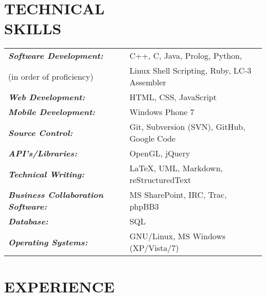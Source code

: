 \documentclass[margin]{res}
\begin{document}
\begin{resume}

\section{TECHNICAL \\ SKILLS}
	\begin{tabular}{l l}
	{\sl \textbf{Software Development:}} &
  C++, C, Java, Prolog, Python, \\ (in order of proficiency) &
  Linux Shell Scripting, Ruby, LC-3 Assembler \\

	{\sl \textbf{Web Development:}} &
	HTML, CSS, JavaScript \\

	{\sl \textbf{Mobile Development:}} &
	Windows Phone 7 \\

	{\sl \textbf{Source Control:}} &
	Git, Subversion (SVN), GitHub, Google Code \\

	{\sl \textbf{API's/Libraries:}} &
	OpenGL, jQuery \\

	{\sl \textbf{Technical Writing:}} &
	\LaTeX, UML, Markdown, reStructuredText \\

	{\sl \textbf{Business Collaboration Software:}} &
  MS SharePoint, IRC, Trac, phpBB3 \\
	  
	{\sl \textbf{Database:}} &	  
  SQL \\	  
	  
	{\sl \textbf{Operating Systems:}} &
  GNU/Linux, MS Windows (XP/Vista/7)

	\end{tabular}	 

\section{EXPERIENCE}


\end{resume}
\end{document}
